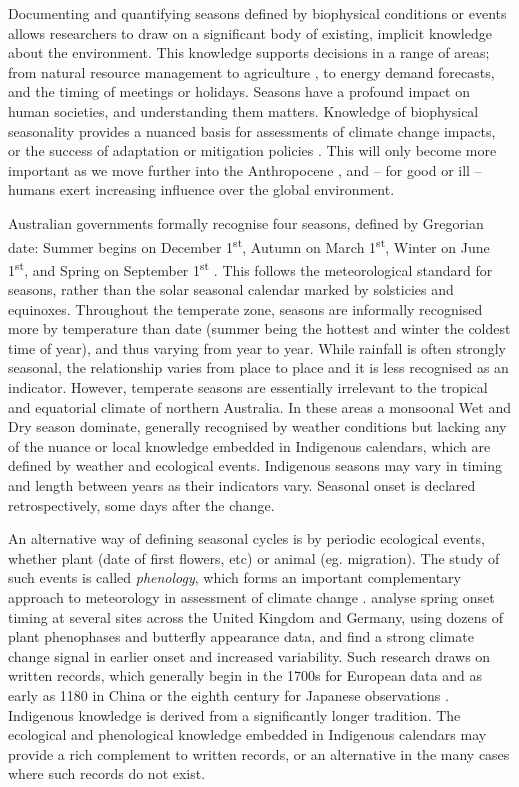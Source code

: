 Documenting and quantifying seasons defined by biophysical conditions
or events allows researchers to draw on a significant body of existing,
implicit knowledge about the environment.
%
This knowledge supports decisions in a range of areas; from natural
resource management to agriculture \citep{woodward2012a,ens2012}, to
energy demand forecasts, and the timing of meetings or holidays.
Seasons have a profound impact on human societies, and understanding
them matters.  Knowledge of biophysical seasonality provides a nuanced
basis for assessments of climate change impacts, or the success of
adaptation or mitigation policies \citep{green2010a,stevenson1996,prober2011}.
This will only become more important as we move further into the Anthropocene
\citep{steffen2007}, and -- for good or ill -- humans exert increasing
influence over the global environment.


Australian governments formally recognise four seasons, defined by Gregorian date:
Summer begins on December 1\textsuperscript{st}, Autumn on March
1\textsuperscript{st}, Winter on June 1\textsuperscript{st}, and Spring
on September 1\textsuperscript{st} \citep{wells2013}. This follows the
meteorological standard for seasons, rather
than the solar seasonal calendar marked by solsticies and equinoxes.
%
Throughout the temperate zone, seasons are informally recognised more by
temperature than date (summer being the hottest and winter the coldest time
of year), and thus varying from year to year.  While rainfall is often
strongly seasonal, the relationship varies from place to place and it is
less recognised as an indicator.
%
However, temperate seasons are essentially irrelevant to the tropical and
equatorial climate of northern Australia.  In these areas a monsoonal Wet
and Dry season dominate, generally recognised by weather conditions \citep[eg.][]{kingsley2003,willmett2009}
but lacking any of the nuance or local knowledge embedded in Indigenous
calendars, which are defined by weather and ecological events.  Indigenous
seasons may vary in timing and length between years as their indicators vary.
Seasonal onset is declared retrospectively, some days after the change.


An alternative way of defining seasonal cycles is by periodic ecological
events, whether plant (date of first flowers, etc) or animal (eg. migration).
The study of such events is called \textit{phenology}, which forms an
important complementary approach to meteorology in assessment of climate
change \citep[eg.][]{roy2000}.  \citet{menzel2006} analyse spring onset timing
at several sites across the United Kingdom and Germany, using dozens of
plant phenophases and butterfly appearance data, and find a strong climate
change signal in earlier onset and increased variability.  Such research
draws on written records, which generally begin in the 1700s for European
data and as early as 1180 in China \citep[][p97]{yoshino1996} or the eighth century
for Japanese observations \citep{sparks2002}.
%
Indigenous knowledge is derived from a significantly longer
tradition.  The ecological and phenological knowledge embedded
in Indigenous calendars may provide a rich complement to written records,
or an alternative in the many cases where such records do not exist.


